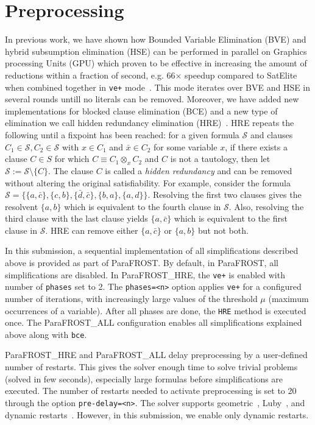\documentclass[conference]{IEEEtran}
\newcommand{\parafrost}{ParaFROST\xspace}
\newcommand{\parafrostHRE}{ParaFROST\_HRE\xspace}
\newcommand{\parafrostALL}{ParaFROST\_ALL\xspace}
\begin{document}
\section{Preprocessing}
In previous work, we have shown how Bounded Variable Elimination (BVE) and hybrid subsumption elimination (HSE) can be performed in parallel on Graphics processing Units (GPU) which proven to be effective in increasing the amount of reductions within a fraction of second, e.g. 66$\times$ speedup compared to SatElite when combined together in \texttt{ve+} mode~\cite{sigmaTacas}. This mode iterates over BVE and HSE in several rounds untill no literals can be removed. Moreover, we
have added new implementations for blocked clause elimination (BCE) and a new type
of elimination we call hidden redundancy elimination (HRE)~\cite{sigmaIfm}. HRE repeats the following until a fixpoint has been reached: for a given formula $\mathcal{S}$ and clauses $C_1\in\mathcal{S},C_2\in\mathcal{S}$ with $x\in C_1$ and $\bar{x}\in C_2$ for some variable $x$, if there exists a clause $C\in S$ for which $C\equiv C_1 \otimes_{x} C_2$ and $C$ is not a tautology, then let $\mathcal{S} := \mathcal{S} \setminus \{C\}$. The clause $C$ is called a \emph{hidden redundancy} and can be removed without altering the original satisfiability.
For example, consider the formula $\mathcal{S}=\{\{a,\bar{c}\},\{c,b\},\{\bar{d},\bar{c}\},\{b, a\},\{a,d\}\}$.
Resolving the first two clauses gives the resolvent $\{a,b\}$ which is equivalent to the fourth clause in $\mathcal{S}$. Also, resolving the third clause with the last clause yields $\{a,\bar{c}\}$ which is equivalent to the first clause in $\mathcal{S}$. HRE can remove either $\{a,\bar{c}\}$ or $\{a,b\}$ but not both.

In this submission, a sequential implementation of all simplifications described above is provided as part of \parafrost. By default, in \parafrost, all simplifications are disabled. 
In \parafrostHRE, the \texttt{ve+} is enabled with number of \texttt{phases} set to 2. The \texttt{phases=<n>} option applies \texttt{ve+} for a configured number of iterations, with increasingly large values of the threshold $\mu$ (maximum occurrences of a variable). After all phases are done, the \texttt{HRE} method is executed once. The \parafrostALL configuration enables all simplifications explained above along with \texttt{bce}.

\parafrostHRE and \parafrostALL delay preprocessing by a user-defined number of restarts. This gives the solver enough time to solve trivial problems (solved in few seconds), especially large formulas before simplifications are executed. The number of restarts needed to activate preprocessing is set to 20 through the option \texttt{pre-delay=<n>}. The solver supports geometric~\cite{geoRestart}, Luby~\cite{minisat}, and dynamic restarts~\cite{dynamicRestarts}. However, in this submission, we enable only dynamic restarts.
%
%
\end{document}
